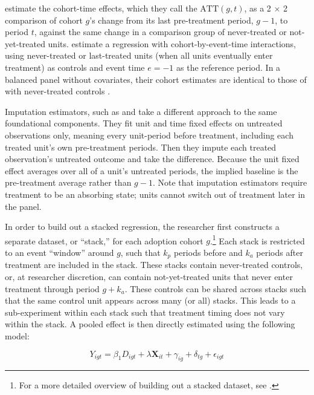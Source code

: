 \documentclass[12pt]{article}
\begin{document}
\textcite{callaway2021difference} estimate the cohort-time effects, which they call the $\text{ATT}(g,t)$, as a 2 $\times$ 2 comparison of cohort $g$'s change from its last pre-treatment period, $g-1$, to period $t$, against the same change in a comparison group of never-treated or not-yet-treated units. \textcite{sun2021estimating} estimate a regression with cohort-by-event-time interactions, using never-treated or last-treated units (when all units eventually enter treatment) as controls and event time $e=-1$ as the reference period. In a balanced panel without covariates, their cohort estimates are identical to those of \textcite{callaway2021difference} with never-treated controls \parencite{roth2023s}.

Imputation estimators, such as \textcite{borusyak2024revisiting} and \textcite{gardner2022two} take a different approach to the same foundational components. They fit unit and time fixed effects on untreated observations only, meaning every unit-period before treatment, including each treated unit's own pre-treatment periods. Then they impute each treated observation's untreated outcome and take the difference. Because the unit fixed effect averages over all of a unit's untreated periods, the implied baseline is the pre-treatment average rather than $g-1$. Note that imputation estimators require treatment to be an absorbing state; units cannot switch out of treatment later in the panel.

In order to build out a stacked regression, the researcher first constructs a separate dataset, or  ``stack,'' for each adoption cohort $g$.\footnote{For a more detailed overview of building out a stacked dataset, see \textcite{wing2024stacked}.} Each stack is restricted to an event ``window'' around $g$, such that $k_p$ periods before and $k_a$ periods after treatment are included in the stack. These stacks contain never-treated controls, or, at researcher discretion, can contain not-yet-treated units that never enter treatment through period $g+k_a$. These controls can be shared across stacks such that the same control unit appears across many (or all) stacks. This leads to a sub-experiment within each stack such that treatment timing does not vary within the stack. A pooled effect is then directly estimated using the following model:


\begin{equation}\label{eq:interactive}
    Y_{igt} = \beta_1 D_{igt} + \lambda \mathbf{X}_{it} + \gamma_{ig} + \delta_{tg} + \epsilon_{igt}
\end{equation}
\end{document}
